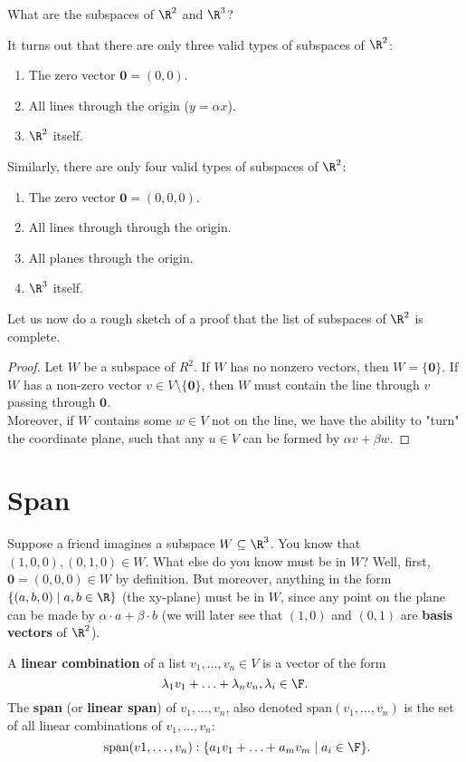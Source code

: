\documentclass[math0540-lecture-notes.tex]{subfiles}
\begin{document}
\begin{example}
  What are the subspaces of $\R^2$ and $\R^3$?
\end{example}
\begin{solution}
  It turns out that there are only three valid types of subspaces of $ \R^2$:
  \begin{enumerate}
    \item The zero vector $\textbf{0}=(0,0)$.
    \item All lines through the origin ($y=\alpha x$).
    \item $\R^2$ itself.
  \end{enumerate}
  Similarly, there are only four valid types of subspaces of $\R^2$:
  \begin{enumerate}
    \item The zero vector $\textbf{0}=(0,0,0)$.
    \item All lines through through the origin.
    \item All planes through the origin.
    \item $\R^3$ itself.
  \end{enumerate}
\end{solution}
Let us now do a rough sketch of a proof that the list of subspaces of $\R^2$ is complete.
\begin{proof}[Proof]
  Let $W$ be a subspace of $ R^2$. If $W$ has no nonzero vectors, then $W=\{ \textbf{0} \}$. If
  $W$ has a non-zero vector  $v \in V\setminus \{ \textbf{0} \}$, then $W$ must contain the line
  through $v$ passing through  $ \textbf{0}$. \\
  Moreover, if $W$ contains some $w\in V$ not on the line, we have the ability to "turn" the
  coordinate plane, such that any $u\in V$ can be formed by $\alpha v + \beta w$.
\end{proof}


\section{Span}
Suppose a friend imagines a subspace $W\subseteq \R^3$. You know that $(1,0,0),(0,1,0)\in W$. What
else do you know must be in $W$? Well, first, $\textbf{0}=(0,0,0)\in W$ by definition. But moreover,
anything in the form $\{ (a,b,0) \mid a,b\in \R \}$ (the xy-plane) must be in $W$, since any point
on the plane can be made by $ \alpha \cdot a + \beta \cdot b$ (we will later see that $(1,0)$ and
$(0,1)$ are \textbf{basis vectors} of $\R^2$).

\begin{definition}{}
  A \textbf{linear combination}  of a list $ v_1,\ldots,v_n\in V$  is a vector of the form \[
      \lambda_1v_1+\ldots+\lambda_nv_n, \lambda_i\in \F
    .\]  The \textbf{span} (or \textbf{linear span}) of $ v_1,\ldots,v_n$, also denoted
    $\text{span}(v_1,\ldots,v_n)$ is the set of all linear combinations of $ v_1,\ldots,v_n$: \[
      ~\text{span}(v1,\ldots,v_n): \{ a_1v_1+\ldots+a_mv_m \mid a_i\in \F\}
    .\] 
\end{definition}
\end{document}
